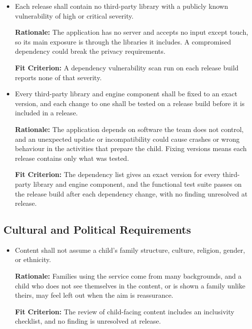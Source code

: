 \documentclass[12pt]{article}
\newcounter{nfrnum} %
\begin{document}
\begin{itemize}
\item[\refstepcounter{nfrnum}\textbf{NFR\thenfrnum}\label{NFR_Immunity}:]
Each release shall contain no third-party library with a publicly known vulnerability of high or critical severity.

\textbf{Rationale:} The application has no server and accepts no input except touch, so its main exposure is through the libraries it includes. A compromised dependency could break the privacy requirements.

\textbf{Fit Criterion:} A dependency vulnerability scan run on each release build reports none of that severity.

\item[\refstepcounter{nfrnum}\textbf{NFR\thenfrnum}\label{NFR_DependencyTesting}:]
Every third-party library and engine component shall be fixed to an exact version, and each change to one shall be tested on a release build before it is included in a release.

\textbf{Rationale:} The application depends on software the team does not control, and an unexpected update or incompatibility could cause crashes or wrong behaviour in the activities that prepare the child. Fixing versions means each release contains only what was tested.

\textbf{Fit Criterion:} The dependency list gives an exact version for every third-party library and engine component, and the functional test suite passes on the release build after each dependency change, with no finding unresolved at release.

\end{itemize}

\subsection{Cultural and Political Requirements}

\begin{itemize}

\item[\refstepcounter{nfrnum}\textbf{NFR\thenfrnum}\label{NFR_Inclusivity}:]
Content shall not assume a child's family structure, culture, religion, gender, or ethnicity.

\textbf{Rationale:} Families using the service come from many backgrounds, and a child who does not see themselves in the content, or is shown a family unlike theirs, may feel left out when the aim is reassurance.

\textbf{Fit Criterion:} The review of child-facing content includes an inclusivity checklist, and no finding is unresolved at release.

\end{itemize}
\end{document}
